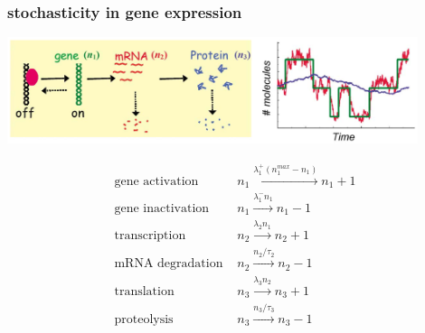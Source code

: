 \begin{frame}
\frametitle{stochasticity in gene expression}
\begin{center}
\includegraphics[width=0.9\textwidth]{fig/stochgeneexpdyn.png}\\
\end{center}
{\scriptsize
\begin{align*}
\text{gene activation } &n_1 \xrightarrow{\lambda_1^+ (n_1^{max}-n_1)}n_1+1\\
\text{gene inactivation } &n_1 \xrightarrow{\lambda_1^- n_1}n_1-1\\
\text{transcription } &n_2 \xrightarrow{\lambda_2 n_1}n_2+1\\
\text{mRNA degradation } &n_2 \xrightarrow{n_2/\tau_2}n_2-1\\
\text{translation } &n_3 \xrightarrow{\lambda_3 n_2}n_3+1\\
\text{proteolysis } &n_3 \xrightarrow{n_3/\tau_3}n_3-1
\end{align*}}\\
\hfill \cite{Paulsson2005}
\end{frame}

